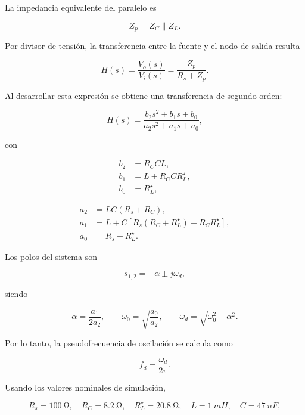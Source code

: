 La impedancia equivalente del paralelo es

\begin{equation}
    Z_p = Z_C \parallel Z_L.
\end{equation}

Por divisor de tensión, la transferencia entre la fuente y el nodo de salida resulta

\begin{equation}
    H(s)=\frac{V_o(s)}{V_i(s)}=\frac{Z_p}{R_s+Z_p}.
\end{equation}

Al desarrollar esta expresión se obtiene una transferencia de segundo orden:

\begin{equation}
    H(s)=
    \frac{b_2s^2+b_1s+b_0}{a_2s^2+a_1s+a_0},
\end{equation}

con

\begin{align}
    b_2 &= R_CCL, \\
    b_1 &= L + R_CCR_L^\star, \\
    b_0 &= R_L^\star,
\end{align}

\begin{align}
    a_2 &= LC(R_s+R_C), \\
    a_1 &= L + C\left[R_s(R_C+R_L^\star)+R_C R_L^\star\right], \\
    a_0 &= R_s+R_L^\star.
\end{align}

Los polos del sistema son

\begin{equation}
    s_{1,2}=-\alpha \pm j\omega_d,
\end{equation}

siendo

\begin{equation}
    \alpha=\frac{a_1}{2a_2},
    \qquad
    \omega_0=\sqrt{\frac{a_0}{a_2}},
    \qquad
    \omega_d=\sqrt{\omega_0^2-\alpha^2}.
\end{equation}

Por lo tanto, la pseudofrecuencia de oscilación se calcula como

\begin{equation}
    \boxed{f_d=\frac{\omega_d}{2\pi}}.
\end{equation}

Usando los valores nominales de simulación,

\begin{equation}
    R_s=\SI{100}{\ohm},\quad
    R_C=\SI{8.2}{\ohm},\quad
    R_L^\star=\SI{20.8}{\ohm},\quad
    L=\SI{1}{mH},\quad
    C=\SI{47}{nF},
\end{equation}

